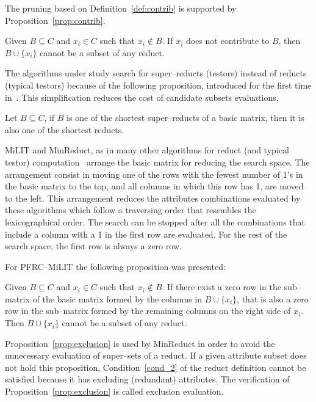 \documentclass[citenumber]{llncs}
\begin{document}
	The pruning based on Definition~\ref{def:contrib} is supported by Proposition~\ref{prop:contrib}.
	
	\begin{proposition}\label{prop:contrib} 
		Given $B \subseteq C$ and  $x_i \in C$ such that $x_i \notin B$. If $x_i$ does not contribute to $B$, then $B\cup\{x_i\}$ cannot be a subset of any reduct.
	\end{proposition}
	
	The algorithms under study search for super--reducts (testors) instead of reducts (typical testors) because of the following proposition, introduced for the first time in~\cite{Zhou2009}. This simplification reduces the cost of candidate subsets evaluations.
	
	\begin{proposition}\label{prop:sr} 
		Let $B \subseteq C$, if $B$ is one of the shortest super--reducts of a basic matrix, then it is also one of the shortest reducts.
	\end{proposition}	

	MiLIT and MinReduct, as in many other algorithms for reduct (and typical testor) computation~\cite{Sanchez07,Lias13,Rodriguez2018} arrange the basic matrix for reducing the search space. The arrangement consist in moving one of the rows with the fewest number of 1's in the basic matrix to the top, and all columns in which this row has 1, are moved to the left. This arrangement reduces the attributes combinations evaluated by these algorithms which follow a traversing order that resembles the lexicographical order. The search can be stopped after all the combinations that include a column with a 1 in the first row are evaluated. For the rest of the search space, the first row is always a zero row.
	
	For PFRC--MiLIT the following proposition was presented:
	
	\begin{proposition}\label{prop:zrPrevail} 
		Given $B \subseteq C$ and  $x_i \in C$ such that $x_i \notin B$. If there exist a zero row in the sub--matrix of the basic matrix formed by the columns in $B\cup\{x_i\}$, that is also a zero row in the sub--matrix formed by the remaining columns on the right side of $x_i$. Then $B\cup\{x_i\}$ cannot be a subset of any reduct.
	\end{proposition}

	Proposition~\ref{prop:exclusion} is used by MinReduct in order to avoid the unnecessary evaluation of super--sets of a reduct. If a given attribute subset does not hold this proposition, Condition~\ref{cond_2} of the reduct definition cannot be satisfied because it has excluding (redundant) attributes. The verification of Proposition~\ref{prop:exclusion} is called exclusion evaluation.
	
\end{document}
